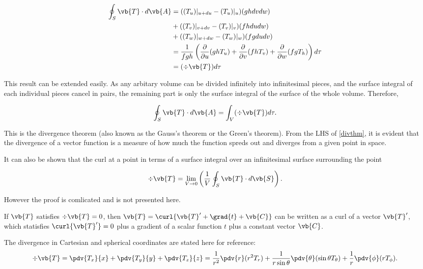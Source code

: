 \documentclass[english,a4paper,12pt]{report}
\begin{document}
\begin{equation} \label{divpre} 
	\begin{aligned} 
    \oint_{S} \vb{T} \cdot d\vb{A} &= ((T_u)|_{u+du} - (T_u)|_{u})(ghdvdw) \\ &+ ((T_v)|_{v+dv} - (T_v)|_{v})(fhdudw) \\ &+ ((T_w)|_{w+dw} - (T_w)|_{w})(fgdudv) \\
    &= \frac{1}{fgh} \left( 
		\frac{\partial}{\partial u} (ghT_{u} ) + 
		\frac{\partial}{\partial v} (fhT_{v} )+ 
		\frac{\partial}{\partial w} (fgT_{h} ) \right) d\tau \\
	&= (\div{\vb{T}}) d\tau
    \end{aligned} 
\end{equation} 
	
This result can be extended easily. As any arbitary volume can be divided infinitely into infinitesimal pieces, and the surface integral of each individual pieces cancel in pairs, the remaining part is only the surface integral of the surface of the whole volume. Therefore,
	
\begin{equation} 
	\oint_{S} \vb{T} \cdot d\vb{A} = \int_{V}(\div{\vb{T} }) d\tau \label{divthm}. 
\end{equation}
	
This is the divergence theorem (also known as the Gauss's theorem or the Green's theorem). From the LHS of \cref{divthm}, it is evident that the divergence of a vector function is a measure of how much the function spreds out and diverges from a given point in space.

It can also be shown that the curl at a point in terms of a surface integral over an infinitesimal surface surrounding the point

\begin{equation}
	\div{\vb{T} } = \lim_{V \to 0} \left( \frac{1}{V} \oint_{S} \vb{T}  \cdot d\vb{S}  \right).
\end{equation}

However the proof is comlicated and is not presented here.

If \(\vb{T} \) satisfies \(\div{\vb{T} } = 0 \), then \(\vb{T} = \curl{\vb{T} ' + \grad{t} + \vb{C} } \) can be written as a curl of a vector \(\vb{T} '\), which statisfies \(\curl{\vb{T} '} = 0 \) plus a gradient of a scalar function \(t\) plus a constant vector \(\vb{C} \).        

The divergence in Cartesian and spherical coordinates are stated here for reference:
\begin{equation} 
	\div{\vb{T}} = \pdv{T_x}{x} + \pdv{T_y}{y} + \pdv{T_z}{z} = \frac{1}{r^2}\pdv{r}(r^2T_r) + \frac{1}{r\sin{\theta}}\pdv{\theta}(\sin{\theta}T_{\theta}) + \frac{1}{r}\pdv{\phi}(rT_{\phi}). 
\end{equation}
	
\end{document}
